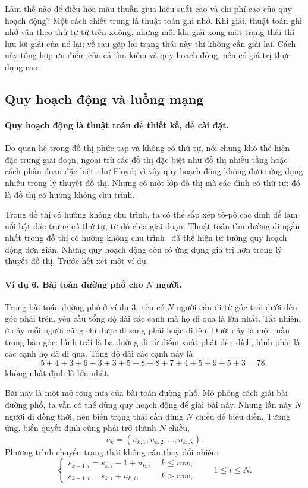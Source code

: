 \documentclass[11pt]{article}
\begin{document}
Làm thế nào để điều hòa mâu thuẫn giữa hiệu suất cao và chi phí cao của quy
hoạch động? Một cách chiết trung là thuật toán ghi nhớ. Khi giải, thuật toán
ghi nhớ vẫn theo thứ tự từ trên xuống, nhưng mỗi khi giải xong một trạng thái
thì lưu lời giải của nó lại; về sau gặp lại trạng thái này thì không cần giải
lại. Cách này tổng hợp ưu điểm của cả tìm kiếm và quy hoạch động, nên có giá
trị thực dụng cao.

\subsection{Quy hoạch động và luồng mạng}

\paragraph{Quy hoạch động là thuật toán dễ thiết kế, dễ cài đặt.}
Do quan hệ trong đồ thị phức tạp và không có thứ tự, nói chung khó thể hiện
đặc trưng giai đoạn, ngoại trừ các đồ thị đặc biệt như đồ thị nhiều tầng hoặc
cách phân đoạn đặc biệt như Floyd; vì vậy quy hoạch động không được ứng dụng
nhiều trong lý thuyết đồ thị. Nhưng có một lớp đồ thị mà các đỉnh có thứ tự:
đó là đồ thị có hướng không chu trình.

Trong đồ thị có hướng không chu trình, ta có thể sắp xếp tô-pô các đỉnh để
làm nổi bật đặc trưng có thứ tự, từ đó chia giai đoạn. Thuật toán tìm đường
đi ngắn nhất trong đồ thị có hướng không chu trình~\cite{modern-algorithms}
đã thể hiện tư tưởng quy hoạch động đơn giản. Nhưng quy hoạch động còn có
ứng dụng giá trị hơn trong lý thuyết đồ thị. Trước hết xét một ví dụ.

\paragraph{Ví dụ 6. Bài toán đường phố cho \(N\) người.}
Trong bài toán đường phố ở ví dụ 3, nếu có \(N\) người cần đi từ góc trái
dưới đến góc phải trên, yêu cầu tổng độ dài các cạnh mà họ đi qua là lớn
nhất. Tất nhiên, ở đây mỗi người cũng chỉ được đi sang phải hoặc đi lên. Dưới
đây là một mẫu trong bản gốc: hình trái là ba đường đi từ điểm xuất phát đến
đích, hình phải là các cạnh họ đã đi qua. Tổng độ dài các cạnh này là
\[
5+4+3+6+3+3+5+8+8+7+4+5+9+5+3=78,
\]
không nhất định là lớn nhất.

Bài này là một mở rộng nữa của bài toán đường phố. Mô phỏng cách giải bài
đường phố, ta vẫn có thể dùng quy hoạch động để giải bài này. Nhưng lần này
\(N\) người đi đồng thời, nên biến trạng thái cần dùng \(N\) chiều để biểu
diễn. Tương ứng, biến quyết định cũng phải trở thành \(N\) chiều,
\[
  u_k=(u_{k,1},u_{k,2},\ldots,u_{k,N}).
\]
Phương trình chuyển trạng thái không cần thay đổi nhiều:
\[
\begin{cases}
s_{k-1,i}=s_{k,i}-1+u_{k,i}, & k\le \mathit{row},\\
s_{k-1,i}=s_{k,i}+u_{k,i}, & k>\mathit{row},
\end{cases}
\qquad 1\le i\le N.
\]
\end{document}
